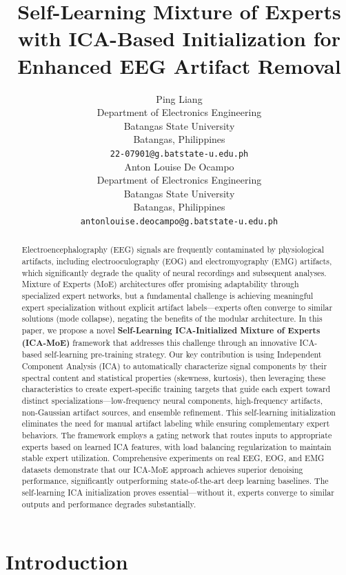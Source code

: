 \documentclass{article}
\title{Self-Learning Mixture of Experts with ICA-Based Initialization for Enhanced EEG Artifact Removal
}
\author{
  Ping Liang \\
  Department of Electronics Engineering \\
  Batangas State University \\
  Batangas, Philippines \\
  \texttt{22-07901@g.batstate-u.edu.ph} \\
   \And
  Anton Louise De Ocampo \\
  Department of Electronics Engineering \\
  Batangas State University \\
  Batangas, Philippines \\
  \texttt{antonlouise.deocampo@g.batstate-u.edu.ph} \\
}
\begin{document}
\maketitle


\begin{abstract}
Electroencephalography (EEG) signals are frequently contaminated by physiological artifacts, including electrooculography (EOG) and electromyography (EMG) artifacts, which significantly degrade the quality of neural recordings and subsequent analyses. Mixture of Experts (MoE) architectures offer promising adaptability through specialized expert networks, but a fundamental challenge is achieving meaningful expert specialization without explicit artifact labels---experts often converge to similar solutions (mode collapse), negating the benefits of the modular architecture. In this paper, we propose a novel \textbf{Self-Learning ICA-Initialized Mixture of Experts (ICA-MoE)} framework that addresses this challenge through an innovative ICA-based self-learning pre-training strategy. Our key contribution is using Independent Component Analysis (ICA) to automatically characterize signal components by their spectral content and statistical properties (skewness, kurtosis), then leveraging these characteristics to create expert-specific training targets that guide each expert toward distinct specializations---low-frequency neural components, high-frequency artifacts, non-Gaussian artifact sources, and ensemble refinement. This self-learning initialization eliminates the need for manual artifact labeling while ensuring complementary expert behaviors. The framework employs a gating network that routes inputs to appropriate experts based on learned ICA features, with load balancing regularization to maintain stable expert utilization. Comprehensive experiments on real EEG, EOG, and EMG datasets demonstrate that our ICA-MoE approach achieves superior denoising performance, significantly outperforming state-of-the-art deep learning baselines. The self-learning ICA initialization proves essential---without it, experts converge to similar outputs and performance degrades substantially.
\end{abstract}



\section{Introduction}
\label{sec:introduction}
\end{document}

